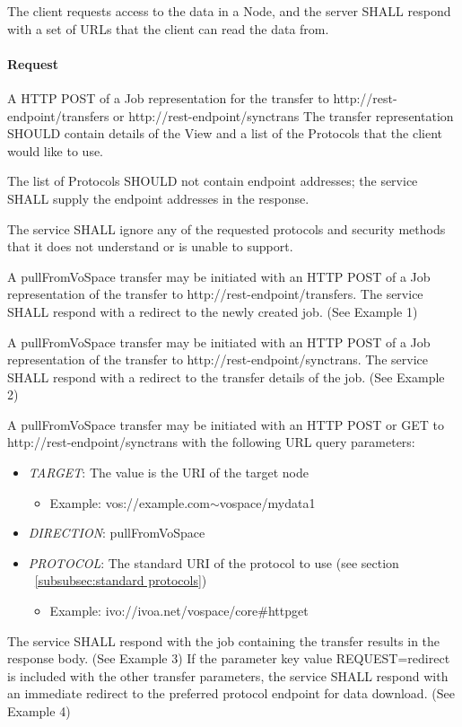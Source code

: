 \documentclass[11pt,a4paper]{ivoa}
\begin{document}
The client requests access to the data in a Node, and the server SHALL respond with a set of URLs that the client can read the data from.

\paragraph{Request}
A HTTP POST of a Job representation for the transfer to http://rest-endpoint/transfers or http://rest-endpoint/synctrans
The transfer representation SHOULD contain details of the View and a list of the Protocols that the client would like to use.

The list of Protocols SHOULD not contain endpoint addresses; the service SHALL supply the endpoint addresses in the response.

The service SHALL ignore any of the requested protocols and security methods that it does not understand or is unable to support.

A pullFromVoSpace transfer may be initiated with an HTTP POST of a Job representation of the transfer to http://rest-endpoint/transfers. The service SHALL respond with a redirect to the newly created job.  (See Example 1)

A pullFromVoSpace transfer may be initiated with an HTTP POST of a Job representation of the transfer to http://rest-endpoint/synctrans. The service SHALL respond with a redirect to the transfer details of the job.  (See Example 2)

A pullFromVoSpace transfer may be initiated with an HTTP POST or GET to http://rest-endpoint/synctrans with the following URL query parameters:
\begin{itemize}
    \item \emph{TARGET}: The value is the URI of the target node
        \begin{itemize}
           \item Example:  vos://example.com$\mathtt{\sim}$vospace/mydata1
        \end{itemize}
    \item \emph{DIRECTION}: pullFromVoSpace
    \item \emph{PROTOCOL}: The standard URI of the protocol to use (see section ~\ref{subsubsec:standard protocols})
        \begin{itemize}
           \item Example: ivo://ivoa.net/vospace/core\#httpget
        \end{itemize}
\end{itemize}
The service SHALL respond with the job containing the transfer results in the response body.  (See Example 3)
If the parameter key value REQUEST=redirect is included with the other transfer parameters, the service SHALL respond with an immediate redirect to the preferred protocol endpoint for data download.  (See Example 4)
\end{document}
